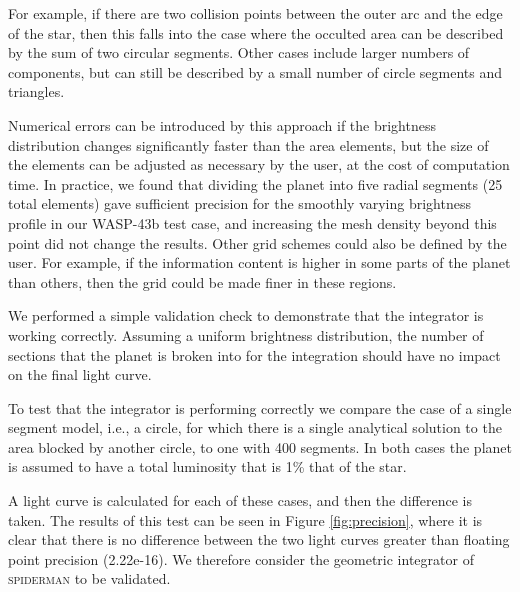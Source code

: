 \documentclass[a4paper,fleqn,usenatbib]{mnras}
\begin{document}
For example, if there are two collision points between the outer arc and the edge of the star, then this falls into the case where the occulted area can be described by the sum of two circular segments. Other cases include larger numbers of components, but can still be described by a small number of circle segments and triangles.

Numerical errors can be introduced by this approach if the brightness distribution changes significantly faster than the area elements, but the size of the elements can be adjusted as necessary by the user, at the cost of computation time.
In practice, we found that dividing the planet into five radial segments (25 total elements) gave sufficient precision for the smoothly varying brightness profile in our WASP-43b test case, and increasing the mesh density beyond this point did not change the results. Other grid schemes could also be defined by the user. For example, if the information content is higher in some parts of the planet than others, then the grid could be made finer in these regions.

We performed a simple validation check to demonstrate that the integrator is working correctly. Assuming a uniform brightness distribution, the number of sections that the planet is broken into for the integration should have no impact on the final light curve.

To test that the integrator is performing correctly we compare the case of a single segment model, i.e., a circle, for which there is a single analytical solution to the area blocked by another circle, to one with 400 segments. In both cases the planet is assumed to have a total luminosity that is 1\% that of the star.

A light curve is calculated for each of these cases, and then the difference is taken. The results of this test can be seen in Figure \ref{fig:precision}, where it is clear that there is no difference between the two light curves greater than floating point precision (2.22e-16). We therefore consider the geometric integrator of \textsc{spiderman} to be validated.
\end{document}
